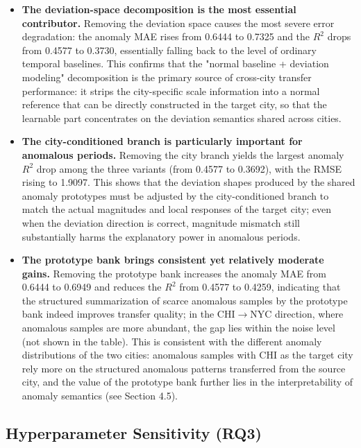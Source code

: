 \begin{itemize}
    \item \textbf{The deviation-space decomposition is the most essential contributor.} Removing the deviation space causes the most severe error degradation: the anomaly MAE rises from 0.6444 to 0.7325 and the $R^2$ drops from 0.4577 to 0.3730, essentially falling back to the level of ordinary temporal baselines. This confirms that the "normal baseline + deviation modeling" decomposition is the primary source of cross-city transfer performance: it strips the city-specific scale information into a normal reference that can be directly constructed in the target city, so that the learnable part concentrates on the deviation semantics shared across cities.
    \item \textbf{The city-conditioned branch is particularly important for anomalous periods.} Removing the city branch yields the largest anomaly $R^2$ drop among the three variants (from 0.4577 to 0.3692), with the RMSE rising to 1.9097. This shows that the deviation shapes produced by the shared anomaly prototypes must be adjusted by the city-conditioned branch to match the actual magnitudes and local responses of the target city; even when the deviation direction is correct, magnitude mismatch still substantially harms the explanatory power in anomalous periods.
    \item \textbf{The prototype bank brings consistent yet relatively moderate gains.} Removing the prototype bank increases the anomaly MAE from 0.6444 to 0.6949 and reduces the $R^2$ from 0.4577 to 0.4259, indicating that the structured summarization of scarce anomalous samples by the prototype bank indeed improves transfer quality; in the CHI$\rightarrow$NYC direction, where anomalous samples are more abundant, the gap lies within the noise level (not shown in the table). This is consistent with the different anomaly distributions of the two cities: anomalous samples with CHI as the target city rely more on the structured anomalous patterns transferred from the source city, and the value of the prototype bank further lies in the interpretability of anomaly semantics (see Section 4.5).
\end{itemize}

\subsection{Hyperparameter Sensitivity (RQ3)}

